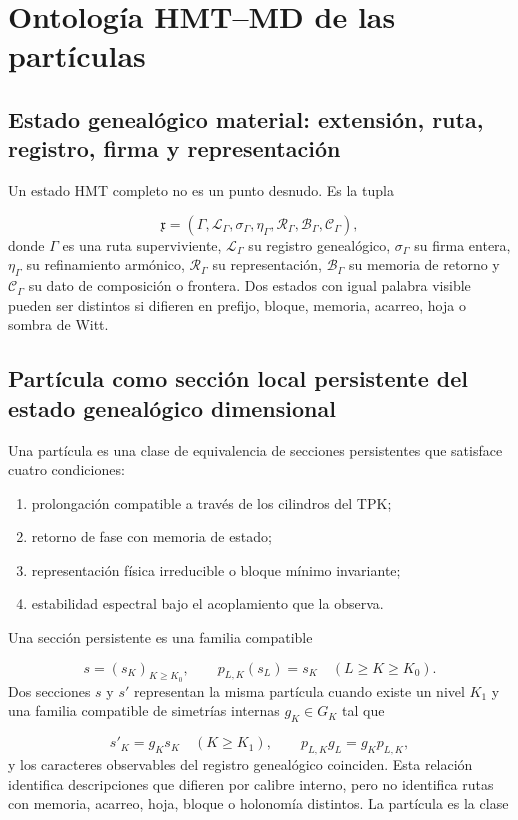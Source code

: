 \section{Ontología HMT--MD de las partículas}
\subsection{Estado genealógico material: extensión, ruta, registro, firma y representación}
Un estado HMT completo no es un punto desnudo. Es la tupla

\[
 \mathfrak x=
 (\Gamma,\mathcal L_\Gamma,\sigma_\Gamma,\eta_\Gamma,
 \mathcal R_\Gamma,\mathcal B_\Gamma,\mathcal C_\Gamma),
\]
donde \(\Gamma\) es una ruta superviviente, \(\mathcal L_\Gamma\) su registro genealógico, \(\sigma_\Gamma\) su firma entera, \(\eta_\Gamma\) su refinamiento armónico, \(\mathcal R_\Gamma\) su representación, \(\mathcal B_\Gamma\) su memoria de retorno y \(\mathcal C_\Gamma\) su dato de composición o frontera. Dos estados con igual palabra visible pueden ser distintos si difieren en prefijo, bloque, memoria, acarreo, hoja o sombra de Witt.

\subsection{Partícula como sección local persistente del estado genealógico dimensional}
Una partícula es una clase de equivalencia de secciones persistentes que satisface cuatro condiciones:

\begin{enumerate}
\item prolongación compatible a través de los cilindros del TPK;
\item retorno de fase con memoria de estado;
\item representación física irreducible o bloque mínimo invariante;
\item estabilidad espectral bajo el acoplamiento que la observa.
\end{enumerate}
Una sección persistente es una familia compatible

\[
 s=(s_K)_{K\ge K_0},\qquad
 p_{L,K}(s_L)=s_K\quad(L\ge K\ge K_0).
\]
Dos secciones \(s\) y \(s'\) representan la misma partícula cuando existe un nivel \(K_1\) y una familia compatible de simetrías internas \(g_K\in G_K\) tal que

\[
 s'_K=g_Ks_K\quad(K\ge K_1),
 \qquad
 p_{L,K}g_L=g_Kp_{L,K},
\]
y los caracteres observables del registro genealógico coinciden. Esta relación identifica descripciones que difieren por calibre interno, pero no identifica rutas con memoria, acarreo, hoja, bloque o holonomía distintos. La partícula es la clase

